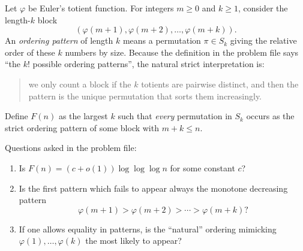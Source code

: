 Let $\varphi$ be Euler's totient function.
For integers $m\ge0$ and $k\ge1$, consider the length-$k$ block
$$(\varphi(m+1),\varphi(m+2),\dots,\varphi(m+k)).$$
An \emph{ordering pattern} of length $k$ means a permutation $\pi\in S_k$ giving the relative order of these $k$ numbers by size.
Because the definition in the problem file says ``the $k!$ possible ordering patterns'', the natural strict interpretation is:
\begin{quote}
we only count a block if the $k$ totients are pairwise distinct, and then the pattern is the unique permutation that sorts them increasingly.
\end{quote}
Define $F(n)$ as the largest $k$ such that \emph{every} permutation in $S_k$ occurs as the strict ordering pattern of some block with $m+k\le n$.

Questions asked in the problem file:
\begin{enumerate}
  \item Is $F(n)=(c+o(1))\log\log\log n$ for some constant $c$?
  \item Is the first pattern which fails to appear always the monotone decreasing pattern
  $$\varphi(m+1)>\varphi(m+2)>\cdots>\varphi(m+k)?$$
  \item If one allows equality in patterns, is the ``natural'' ordering mimicking $\varphi(1),\dots,\varphi(k)$ the most likely to appear?
\end{enumerate}
